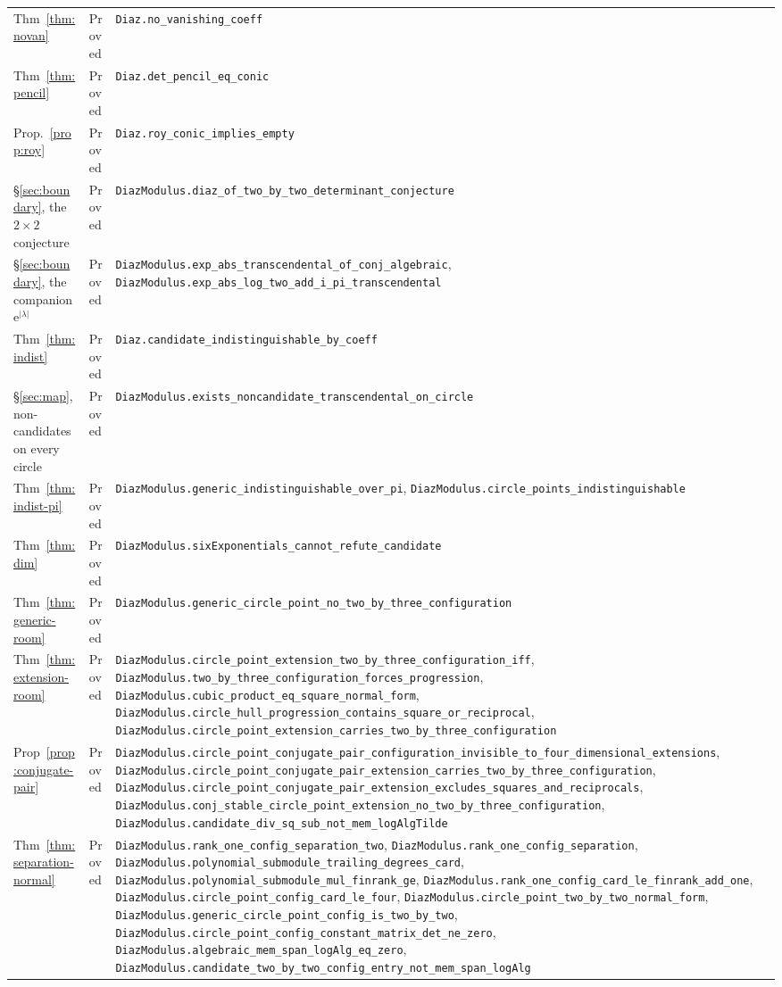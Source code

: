 \documentclass[11pt,a4paper]{article}
\theoremstyle{plain}
\theoremstyle{definition}
\newcommand{\e}{\mathrm{e}}
\begin{document}
\begin{center}
\begin{longtable}{@{}llp{6.2cm}@{}}
Thm~\ref{thm:novan} & Proved & \nolinkurl{Diaz.no_vanishing_coeff} \\
Thm~\ref{thm:pencil} & Proved & \nolinkurl{Diaz.det_pencil_eq_conic} \\
Prop.~\ref{prop:roy} & Proved & \nolinkurl{Diaz.roy_conic_implies_empty} \\
\S\ref{sec:boundary}, the $2\times2$ conjecture & Proved & \nolinkurl{DiazModulus.diaz_of_two_by_two_determinant_conjecture} \\
\S\ref{sec:boundary}, the companion $\e^{|\lambda|}$ & Proved & \nolinkurl{DiazModulus.exp_abs_transcendental_of_conj_algebraic}, \nolinkurl{DiazModulus.exp_abs_log_two_add_i_pi_transcendental} \\
Thm~\ref{thm:indist} & Proved & \nolinkurl{Diaz.candidate_indistinguishable_by_coeff} \\
\S\ref{sec:map}, non-candidates on every circle & Proved & \nolinkurl{DiazModulus.exists_noncandidate_transcendental_on_circle} \\
Thm~\ref{thm:indist-pi} & Proved & \nolinkurl{DiazModulus.generic_indistinguishable_over_pi}, \nolinkurl{DiazModulus.circle_points_indistinguishable} \\
Thm~\ref{thm:dim} & Proved & \nolinkurl{DiazModulus.sixExponentials_cannot_refute_candidate} \\
Thm~\ref{thm:generic-room} & Proved & \nolinkurl{DiazModulus.generic_circle_point_no_two_by_three_configuration} \\
Thm~\ref{thm:extension-room} & Proved & \nolinkurl{DiazModulus.circle_point_extension_two_by_three_configuration_iff}, \nolinkurl{DiazModulus.two_by_three_configuration_forces_progression}, \nolinkurl{DiazModulus.cubic_product_eq_square_normal_form}, \nolinkurl{DiazModulus.circle_hull_progression_contains_square_or_reciprocal}, \nolinkurl{DiazModulus.circle_point_extension_carries_two_by_three_configuration} \\
Prop~\ref{prop:conjugate-pair} & Proved & \nolinkurl{DiazModulus.circle_point_conjugate_pair_configuration_invisible_to_four_dimensional_extensions}, \nolinkurl{DiazModulus.circle_point_conjugate_pair_extension_carries_two_by_three_configuration}, \nolinkurl{DiazModulus.circle_point_conjugate_pair_extension_excludes_squares_and_reciprocals}, \nolinkurl{DiazModulus.conj_stable_circle_point_extension_no_two_by_three_configuration}, \nolinkurl{DiazModulus.candidate_div_sq_sub_not_mem_logAlgTilde} \\
Thm~\ref{thm:separation-normal} & Proved & \nolinkurl{DiazModulus.rank_one_config_separation_two}, \nolinkurl{DiazModulus.rank_one_config_separation}, \nolinkurl{DiazModulus.polynomial_submodule_trailing_degrees_card}, \nolinkurl{DiazModulus.polynomial_submodule_mul_finrank_ge}, \nolinkurl{DiazModulus.rank_one_config_card_le_finrank_add_one}, \nolinkurl{DiazModulus.circle_point_config_card_le_four}, \nolinkurl{DiazModulus.circle_point_two_by_two_normal_form}, \nolinkurl{DiazModulus.generic_circle_point_config_is_two_by_two}, \nolinkurl{DiazModulus.circle_point_config_constant_matrix_det_ne_zero}, \nolinkurl{DiazModulus.algebraic_mem_span_logAlg_eq_zero}, \nolinkurl{DiazModulus.candidate_two_by_two_config_entry_not_mem_span_logAlg} \\

\end{longtable}
\end{center}
\end{document}
